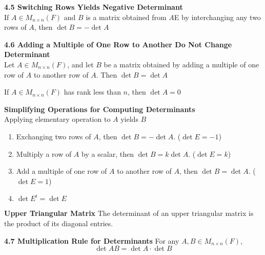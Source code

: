 \documentclass[11pt]{article}
\begin{document}
\begin{theorem*}
    \textbf{4.5 Switching Rows Yields Negative Determinant} \\
    If $A\in M_{n\times n}(F)$ and $B$ is a matrix obtained from $A$E by interchanging any two rows of $A$, then $\det{B}=-\det{A}$
\end{theorem*}

\begin{theorem*}
    \textbf{4.6 Adding a Multiple of One Row to Another Do Not Change Determinant}\\ 
    Let $A\in M_{n\times n}(F)$, and let $B$ be a matrix obtained by adding a multiple of one row of $A$ to another row of $A$. Then $\det{B} = \det{A}$
\end{theorem*}


\begin{corollary*}
    If $A\in M_{n\times n}(F)$ has rank less than $n$, then $\det{A}=0$
\end{corollary*}

\begin{defn*}
    \textbf{Simplifying Operations for Computing Determinants} \\
    Applying elementary operation to $A$ yields $B$
    \begin{enumerate}
        \item Exchanging two rows of $A$, then $\det{B}=-\det{A}$. ($\det{E} = -1$)
        \item Multiply a row of $A$ by a scalar, then $\det{B}=k\det{A}$. ($\det{E} = k$)
        \item Add a multiple of one row of $A$ to another row of $A$, then $\det{B}=\det{A}$. ($\det{E}=1$)
        \item $\det{E^t} = \det{E}$
    \end{enumerate}
\end{defn*}

\begin{defn*}
    \textbf{Upper Triangular Matrix} The determinant of an upper triangular matrix is the product of its diagonal entries. 
\end{defn*}





\begin{theorem*}
    \textbf{4.7 Multiplication Rule for Determinants} For any $A,B\in M_{n\times n}(F)$,
    \[
        \det{AB} = \det{A} \cdot \det{B}    
    \]
\end{theorem*}
\end{document}
